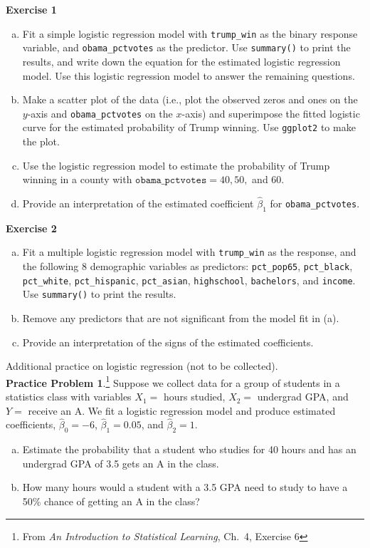 \documentclass[11pt]{article}\usepackage[]{graphicx}\usepackage[]{color}
\begin{document}
\textbf{Exercise 1}
\begin{enumerate}[(a)]
\item Fit a simple logistic regression model with \texttt{trump\_win} as the binary response variable, and \texttt{obama\_pctvotes} as the predictor.  Use \texttt{summary()} to print the results, and write down the equation for the estimated logistic regression model.  Use this logistic regression model to answer the remaining questions.
\item Make a scatter plot of the data (i.e., plot the observed zeros and ones on the $y$-axis and \texttt{obama\_pctvotes} on the $x$-axis) and superimpose the fitted logistic curve for the estimated probability of Trump winning.  Use \texttt{ggplot2} to make the plot.
\item Use the logistic regression model to estimate the probability of Trump winning in a county with $\texttt{obama\_pctvotes} = 40, 50,$ and $60$.  
\item Provide an interpretation of the estimated coefficient $\hat{\beta}_1$ for \texttt{obama\_pctvotes}.
\end{enumerate}
\clearpage

\textbf{Exercise 2}
\begin{enumerate}[(a)]
\item Fit a multiple logistic regression model with \texttt{trump\_win} as the response, and the following 8 demographic variables as predictors: \texttt{pct\_pop65}, \texttt{pct\_black}, \texttt{pct\_white}, \texttt{pct\_hispanic}, \texttt{pct\_asian}, \texttt{highschool}, \texttt{bachelors}, and \texttt{income}.  Use \texttt{summary()} to print the results.
\item Remove any predictors that are not significant from the model fit in (a).  
\item Provide an interpretation of the signs of the estimated coefficients.\\
\end{enumerate}

\hrulefill
\vspace{11pt}

Additional practice on logistic regression (not to be collected).\\

\textbf{Practice Problem 1}.\footnote{From \emph{An Introduction to Statistical Learning}, Ch.~4, Exercise 6}  Suppose we collect data for a group of students in a statistics class with variables $X_1 = $ hours studied, $X_2 = $ undergrad GPA, and $Y = $ receive an A.  We fit a logistic regression model and produce estimated coefficients, $\hat{\beta}_0 = -6$, $\hat{\beta}_1 = 0.05$, and $\hat{\beta}_2 = 1$.
\begin{enumerate}[(a)]
\item Estimate the probability that a student who studies for 40 hours and has an undergrad GPA of 3.5 gets an A in the class.
\item How many hours would a student with a 3.5 GPA need to study to have a 50\% chance of getting an A in the class?\\
\end{enumerate}
\end{document}
